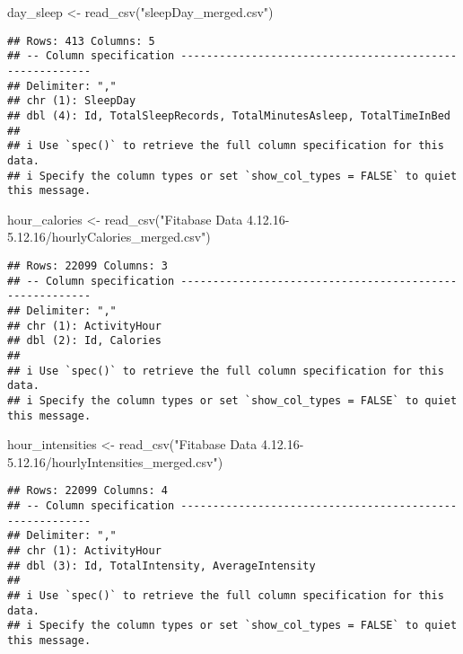 \documentclass[
]{article}
\newenvironment{Shaded}{\begin{snugshade}}{\end{snugshade}}
\newcommand{\FunctionTok}[1]{\textcolor[rgb]{0.00,0.00,0.00}{#1}}
\newcommand{\NormalTok}[1]{#1}
\newcommand{\OtherTok}[1]{\textcolor[rgb]{0.56,0.35,0.01}{#1}}
\newcommand{\StringTok}[1]{\textcolor[rgb]{0.31,0.60,0.02}{#1}}
\begin{document}
\begin{Shaded}
\begin{Highlighting}[]
\NormalTok{day\_sleep }\OtherTok{\textless{}{-}} \FunctionTok{read\_csv}\NormalTok{(}\StringTok{"sleepDay\_merged.csv"}\NormalTok{)}
\end{Highlighting}
\end{Shaded}

\begin{verbatim}
## Rows: 413 Columns: 5
## -- Column specification --------------------------------------------------------
## Delimiter: ","
## chr (1): SleepDay
## dbl (4): Id, TotalSleepRecords, TotalMinutesAsleep, TotalTimeInBed
## 
## i Use `spec()` to retrieve the full column specification for this data.
## i Specify the column types or set `show_col_types = FALSE` to quiet this message.
\end{verbatim}

\begin{Shaded}
\begin{Highlighting}[]
\NormalTok{hour\_calories }\OtherTok{\textless{}{-}} \FunctionTok{read\_csv}\NormalTok{(}\StringTok{"Fitabase Data 4.12.16{-}5.12.16/hourlyCalories\_merged.csv"}\NormalTok{)}
\end{Highlighting}
\end{Shaded}

\begin{verbatim}
## Rows: 22099 Columns: 3
## -- Column specification --------------------------------------------------------
## Delimiter: ","
## chr (1): ActivityHour
## dbl (2): Id, Calories
## 
## i Use `spec()` to retrieve the full column specification for this data.
## i Specify the column types or set `show_col_types = FALSE` to quiet this message.
\end{verbatim}

\begin{Shaded}
\begin{Highlighting}[]
\NormalTok{hour\_intensities }\OtherTok{\textless{}{-}} \FunctionTok{read\_csv}\NormalTok{(}\StringTok{"Fitabase Data 4.12.16{-}5.12.16/hourlyIntensities\_merged.csv"}\NormalTok{)}
\end{Highlighting}
\end{Shaded}

\begin{verbatim}
## Rows: 22099 Columns: 4
## -- Column specification --------------------------------------------------------
## Delimiter: ","
## chr (1): ActivityHour
## dbl (3): Id, TotalIntensity, AverageIntensity
## 
## i Use `spec()` to retrieve the full column specification for this data.
## i Specify the column types or set `show_col_types = FALSE` to quiet this message.
\end{verbatim}
\end{document}

